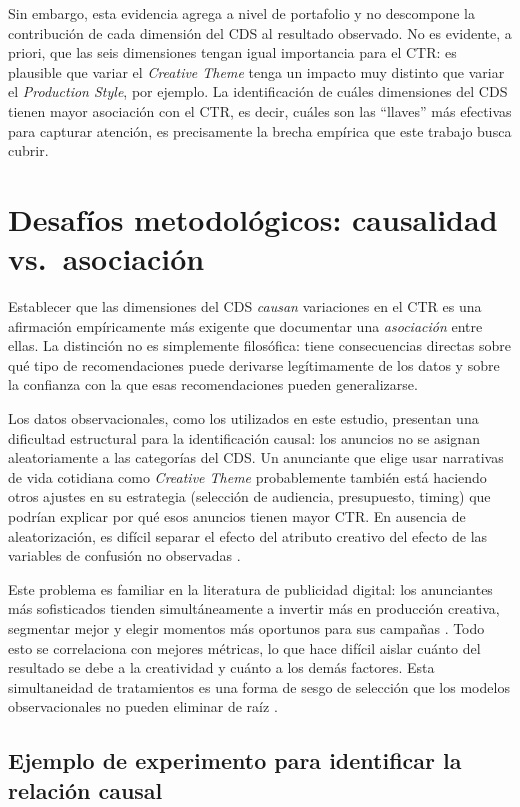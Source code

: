 \documentclass[12pt, a4paper]{report}
\begin{document}
Sin embargo, esta evidencia agrega a nivel de portafolio y no descompone la contribución de cada
dimensión del CDS al resultado observado. No es evidente, a priori, que las seis dimensiones tengan
igual importancia para el CTR: es plausible que variar el \textit{Creative Theme} tenga un impacto
muy distinto que variar el \textit{Production Style}, por ejemplo. La identificación de cuáles
dimensiones del CDS tienen mayor asociación con el CTR, es decir, cuáles son las ``llaves'' más
efectivas para capturar atención, es precisamente la brecha empírica que este trabajo busca cubrir.

\section{Desafíos metodológicos: causalidad vs.\ asociación}

Establecer que las dimensiones del CDS \textit{causan} variaciones en el CTR es una afirmación
empíricamente más exigente que documentar una \textit{asociación} entre ellas. La distinción no es
simplemente filosófica: tiene consecuencias directas sobre qué tipo de recomendaciones puede derivarse
legítimamente de los datos y sobre la confianza con la que esas recomendaciones pueden generalizarse.

Los datos observacionales, como los utilizados en este estudio, presentan una dificultad estructural
para la identificación causal: los anuncios no se asignan aleatoriamente a las categorías del CDS.
Un anunciante que elige usar narrativas de vida cotidiana como \textit{Creative Theme} probablemente
también está haciendo otros ajustes en su estrategia (selección de audiencia, presupuesto,
timing) que podrían explicar por qué esos anuncios tienen mayor CTR. En ausencia de aleatorización,
es difícil separar el efecto del atributo creativo del efecto de las variables de confusión no
observadas \citep{cunningham2021}.

Este problema es familiar en la literatura de publicidad digital: los anunciantes más sofisticados
tienden simultáneamente a invertir más en producción creativa, segmentar mejor y elegir momentos
más oportunos para sus campañas \citep{yang2025}. Todo esto se correlaciona con mejores métricas,
lo que hace difícil aislar cuánto del resultado se debe a la creatividad y cuánto a los demás
factores. Esta simultaneidad de tratamientos es una forma de sesgo de selección que los modelos
observacionales no pueden eliminar de raíz \citep{cunningham2021}.

\subsection{Ejemplo de experimento para identificar la relación causal}
\end{document}
